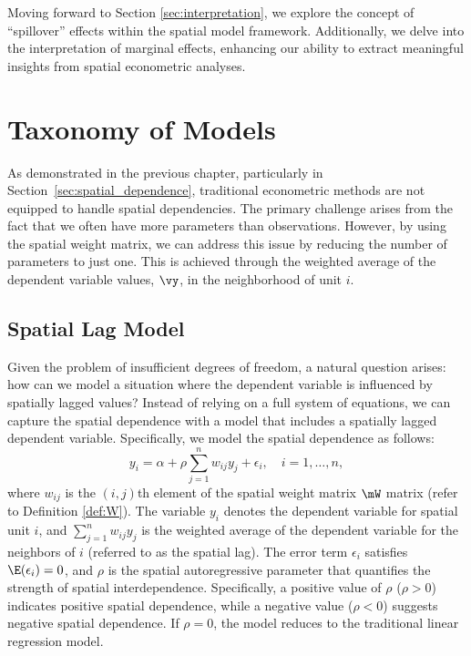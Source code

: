 \documentclass[english,12pt]{book}\usepackage[]{graphicx}\usepackage[]{xcolor}
\begin{document}
Moving forward to Section \ref{sec:interpretation}, we explore the concept of ``spillover'' effects within the spatial model framework. Additionally, we delve into the interpretation of marginal effects, enhancing our ability to extract meaningful insights from spatial econometric analyses.

\section{Taxonomy of Models}\label{sec:taxonomy}

As demonstrated in the previous chapter, particularly in Section~\ref{sec:spatial_dependence}, traditional econometric methods are not equipped to handle spatial dependencies. The primary challenge arises from the fact that we often have more parameters than observations. However, by using the spatial weight matrix, we can address this issue by reducing the number of parameters to just one. This is achieved through the weighted average of the dependent variable values, $\vy$, in the neighborhood of unit $i$.

\subsection{Spatial Lag Model}

Given the problem of insufficient degrees of freedom, a natural question arises: how can we model a situation where the dependent variable is influenced by spatially lagged values? Instead of relying on a full system of equations, we can capture the spatial dependence with a model that includes a spatially lagged dependent variable. Specifically, we model the spatial dependence as follows:
\begin{equation}\label{eq:slm_model_1}
y_i = \alpha +\rho \sum_{j = 1}^n w_{ij}y_j + \epsilon_i, \quad i = 1,\ldots,n,
\end{equation}
%
where $w_{ij}$ is the $(i,j)$th element of the spatial weight matrix $\mW$ matrix (refer to Definition \ref{def:W}). The variable $y_i$ denotes the dependent variable for spatial unit $i$, and $\sum_{j = 1}^n w_{ij} y_j$ is the weighted average of the dependent variable for the neighbors of $i$ (referred to as the spatial lag). The error term $\epsilon_i$ satisfies $\E(\epsilon_i) = 0$, and $\rho$ is the spatial autoregressive parameter that quantifies the strength of spatial interdependence. Specifically, a positive value of $\rho$ ($\rho > 0$) indicates positive spatial dependence, while a negative value ($\rho < 0$) suggests negative spatial dependence. If $\rho = 0$, the model reduces to the traditional linear regression model.
\end{document}
